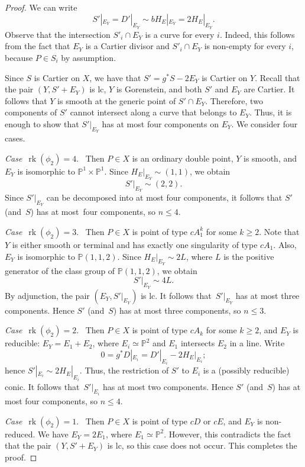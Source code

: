 \documentclass[11pt]{amsart}
\numberwithin{equation}{section}
\theoremstyle{definition}
\theoremstyle{remark}
\DeclareMathOperator{\rk}{rk}
\begin{document}
\begin{proof}
We can write
\[
S'|_{E_Y} = D'|_{E_Y} \sim b H_E|_{E_Y}=2 H_E|_{E_Y}.
\] 
Observe that the intersection $S'_i\cap E_Y$ is a curve for every $i$. Indeed, this follows from the fact that $E_Y$ is a Cartier divisor and $S'_i\cap E_Y$ is non-empty for every $i$, because $P\in S_i$ by assumption.

Since $S$ is Cartier on $X$, we have that $S' = g^*S-2E_Y$ is Cartier on $Y$.   
Recall that the pair $(Y, S'+E_Y)$ is lc, $Y$ is Gorenstein, and both $S'$ and $E_Y$ are Cartier. It follows that $Y$ is smooth at the generic point of $S'\cap E_Y$. Therefore, two components of $S'$ cannot intersect along a curve that belongs to $E_Y$. Thus, it is enough to show that $S'|_{E_Y}$ has at most four components on $E_Y$.
We consider four cases.

\emph{Case}~$\rk(\phi_2)=4$.~
 Then $P\in X$ is an ordinary double point, $Y$ is smooth, and $E_Y$ is isomorphic to $\mathbb{P}^1\times\mathbb{P}^1$. Since $H_E|_{E_Y}\sim(1,1)$, we obtain
\[
S'|_{E_Y}\sim (2,2).
\]
Since $S'|_{E_Y}$ can be decomposed into at most four components, it follows that $S'$ (and~$S$) has at most~four components, so $n\leq 4$.

\emph{Case}~$\rk(\phi_2)=3$.~
Then $P\in X$ is point of type $cA_1^k$ for some $k\geq 2$. 
Note that $Y$ is either smooth or terminal and has exactly one singularity of type $cA_1$. 
Also, $E_Y$ is isomorphic to $\mathbb{P}(1,1,2)$.
Since $H_E|_{E_Y}\sim 2 L$, where $L$ is the positive generator of the class group of $\mathbb{P}(1,1,2)$, we obtain
\[
S'|_{E_Y} \sim 4 L.
\]
By adjunction, the pair $(E_Y, S'|_{E_Y})$ is lc. It follows that~$S'|_{E_Y}$ has at most three components. Hence $S'$ (and~$S$) has at most three components, so $n\leq 3$.

\emph{Case}~$\rk(\phi_2)=2$.~  Then $P\in X$ is point of type $cA_k$ for some $k\geq 2$, and $E_Y$ is reducible: $E_Y=E_1+E_2$, where $E_i\simeq \mathbb{P}^2$ and $E_1$ intersects $E_2$ in a line. Write 
\[
0 = g^*D|_{E_i} = D'|_{E_i} - 2 H_E|_{E_i}; 
\]
hence $S'|_{E_i}\sim 2 H_E|_{E_i}$.
Thus, the restriction of $S'$ to $E_i$ is a (possibly reducible) conic. It follows that~$S'|_{E_i}$ has at most two components. Hence $S'$ (and~$S$) has at most four components, so $n\leq 4$.

\emph{Case}~$\rk(\phi_2)=1$.~
Then $P\in X$ is point of type $cD$ or $cE$, and $E_Y$ is non-reduced. We have $E_Y = 2 E_1$, where $E_1\simeq \mathbb{P}^2$. 
However, this contradicts the fact that the pair $(Y, S' + E_Y)$ is lc, so this case does not occur. 
This completes the proof.
\end{proof}
\end{document}
